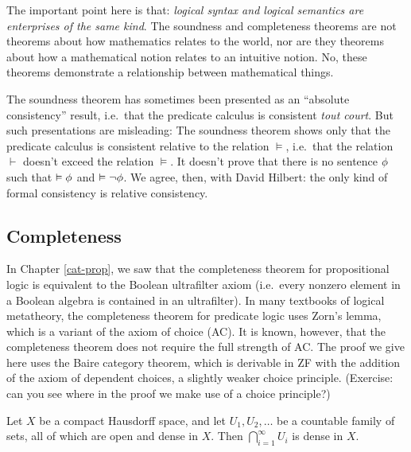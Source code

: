The important point here is that: {\it logical syntax and logical
semantics are enterprises of the same kind}.  The soundness and
completeness theorems are not theorems about how mathematics relates
to the world, nor are they theorems about how a mathematical notion
relates to an intuitive notion.  No, these theorems demonstrate a
relationship between mathematical things.

The soundness theorem has sometimes been presented as an ``absolute
consistency'' result, i.e.\ that the predicate calculus is consistent
\textit{tout court}.  But such presentations are misleading: The
soundness theorem shows only that the predicate calculus is consistent
relative to the relation $\vDash$, i.e.\ that the relation $\vdash$
doesn't exceed the relation $\vDash$.  It doesn't prove that there is
no sentence $\phi$ such that $\vDash \phi$ and $\vDash \neg \phi$.  We
agree, then, with David Hilbert: the only kind of formal consistency
is relative consistency.


\subsection*{Completeness}


In Chapter \ref{cat-prop}, we saw that the completeness theorem for
propositional logic is equivalent to the Boolean ultrafilter axiom
(i.e.\ every nonzero element in a Boolean algebra is contained in an
ultrafilter).  In many textbooks of logical metatheory, the
completeness theorem for predicate logic uses Zorn's lemma, which is a
variant of the axiom of choice (AC).  It is known, however, that the
completeness theorem does not require the full strength of AC.  The
proof we give here uses the Baire category theorem, which is derivable
in ZF with the addition of the axiom of dependent choices, a slightly
weaker choice principle.  (Exercise: can you see where in the proof we
make use of a choice principle?)


\begin{thm} Let $X$ be a compact Hausdorff
  space, and let $U_1,U_2,\dots $ be a countable family of sets, all
  of which are open and dense in $X$. Then
  $\bigcap _{i=1}^{\infty}U_i$ is dense in $X$. \end{thm}

